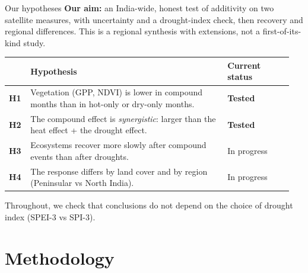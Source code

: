 \documentclass[11pt,aspectratio=169]{beamer}
\begin{document}
\begin{frame}{Our hypotheses}
  \small
  \textbf{Our aim:} an India-wide, honest test of additivity on two satellite
  measures, with uncertainty and a drought-index check, then recovery and
  regional differences. This is a regional synthesis with extensions, not a
  first-of-its-kind study.

  \vspace{6pt}
  \renewcommand{\arraystretch}{1.15}
  \begin{tabular}{@{}L{0.07\linewidth}L{0.66\linewidth}L{0.22\linewidth}@{}}
    \toprule
    & \textbf{Hypothesis} & \textbf{Current status} \\
    \midrule
    \textbf{H1} & Vegetation (GPP, NDVI) is lower in compound months than in
      hot-only or dry-only months. & \textbf{Tested} \\
    \textbf{H2} & The compound effect is \emph{synergistic}: larger than the
      heat effect + the drought effect. & \textbf{Tested} \\
    \textbf{H3} & Ecosystems recover more slowly after compound events than
      after droughts. & In progress \\
    \textbf{H4} & The response differs by land cover and by region
      (Peninsular vs North India). & In progress \\
    \bottomrule
  \end{tabular}

  \vspace{6pt}
  \scriptsize Throughout, we check that conclusions do not depend on the
  choice of drought index (SPEI-3 vs SPI-3).
\end{frame}

\section{Methodology}
\end{document}
